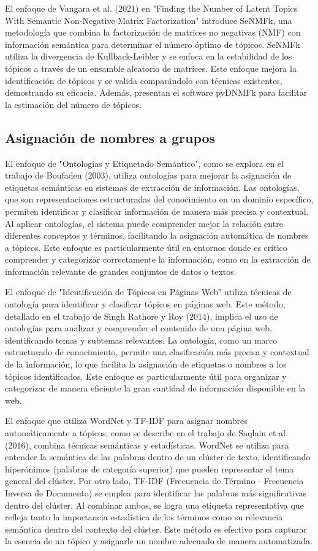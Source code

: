 El enfoque de Vangara et al. (2021) en "Finding the Number of Latent Topics With Semantic Non-Negative Matrix Factorization" introduce SeNMFk, una metodología que combina la factorización de matrices no negativas (NMF) con información semántica para determinar el número óptimo de tópicos. SeNMFk utiliza la divergencia de Kullback-Leibler y se enfoca en la estabilidad de los tópicos a través de un ensamble aleatorio de matrices. Este enfoque mejora la identificación de tópicos y se valida comparándolo con técnicas existentes, demostrando su eficacia. Además, presentan el software pyDNMFk para facilitar la estimación del número de tópicos.

\subsection{Asignaci\'on de nombres a grupos}

El enfoque de "Ontologías y Etiquetado Semántico", como se explora en el trabajo de Boufaden (2003), utiliza ontologías para mejorar la asignación de etiquetas semánticas en sistemas de extracción de información. Las ontologías, que son representaciones estructuradas del conocimiento en un dominio específico, permiten identificar y clasificar información de manera más precisa y contextual. Al aplicar ontologías, el sistema puede comprender mejor la relación entre diferentes conceptos y términos, facilitando la asignación automática de nombres a tópicos. Este enfoque es particularmente útil en entornos donde es crítico comprender y categorizar correctamente la información, como en la extracción de información relevante de grandes conjuntos de datos o textos.

El enfoque de "Identificación de Tópicos en Páginas Web" utiliza técnicas de ontología para identificar y clasificar tópicos en páginas web. Este método, detallado en el trabajo de Singh Rathore y Roy (2014), implica el uso de ontologías para analizar y comprender el contenido de una página web, identificando temas y subtemas relevantes. La ontología, como un marco estructurado de conocimiento, permite una clasificación más precisa y contextual de la información, lo que facilita la asignación de etiquetas o nombres a los tópicos identificados. Este enfoque es particularmente útil para organizar y categorizar de manera eficiente la gran cantidad de información disponible en la web.

El enfoque que utiliza WordNet y TF-IDF para asignar nombres automáticamente a tópicos, como se describe en el trabajo de Saqlain et al. (2016), combina técnicas semánticas y estadísticas. WordNet se utiliza para entender la semántica de las palabras dentro de un clúster de texto, identificando hiperónimos (palabras de categoría superior) que pueden representar el tema general del clúster. Por otro lado, TF-IDF (Frecuencia de Término - Frecuencia Inversa de Documento) se emplea para identificar las palabras más significativas dentro del clúster. Al combinar ambos, se logra una etiqueta representativa que refleja tanto la importancia estadística de los términos como su relevancia semántica dentro del contexto del clúster. Este método es efectivo para capturar la esencia de un tópico y asignarle un nombre adecuado de manera automatizada.

